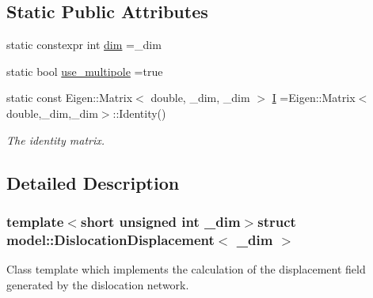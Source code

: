 \subsection*{Static Public Attributes}
\begin{DoxyCompactItemize}
\item 
static constexpr int \hyperlink{structmodel_1_1_dislocation_displacement_acf0c18c91d020e290940fea31cce1e3a}{dim} =\+\_\+dim
\item 
static bool \hyperlink{structmodel_1_1_dislocation_displacement_ae6c30ea7e7b36e1daa8579202b1a5060}{use\+\_\+multipole} =true
\item 
static const Eigen\+::\+Matrix$<$ double, \+\_\+dim, \+\_\+dim $>$ \hyperlink{structmodel_1_1_dislocation_displacement_a82bd096329abc7cdeff9009381a7ea9e}{I} =Eigen\+::\+Matrix$<$double,\+\_\+dim,\+\_\+dim$>$\+::Identity()
\begin{DoxyCompactList}\small\item\em The identity matrix. \end{DoxyCompactList}\end{DoxyCompactItemize}


\subsection{Detailed Description}
\subsubsection*{template$<$short unsigned int \+\_\+dim$>$struct model\+::\+Dislocation\+Displacement$<$ \+\_\+dim $>$}

Class template which implements the calculation of the displacement field generated by the dislocation network. 


